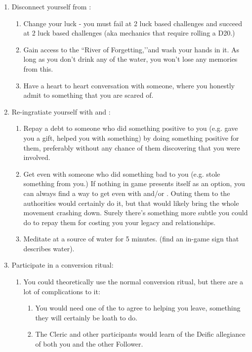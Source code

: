 \documentclass[green]{GL2020}
\begin{document}
\begin{enumerate}
  \item Disconnect yourself from \cGenesis{}:
  \begin{enumerate}
    \item Change your luck - you must fail at 2 luck based challenges and succeed at 2 luck based challenges (aka mechanics that require rolling a D20.)
    \item Gain access to the ``River of Forgetting,’’and wash your hands in it. As long as you don’t drink any of the water, you won’t lose any memories from this.
    \item Have a heart to heart conversation with someone, where you honestly admit to something that you are scared of.
  \end{enumerate}
  \item Re-ingratiate yourself with \cEbb{} and \cFlow{}:
  \begin{enumerate}
    \item Repay a debt to someone who did something positive to you (e.g. gave you a gift, helped you with something) by doing something positive for them, preferably without any chance of them discovering that you were involved.
    \item Get even with someone who did something bad to you (e.g. stole something from you.) If nothing in game presents itself as an option, you can always find a way to get even with \cChupLeader{\full} and/or \cChupSecond{\full}. Outing them to the authorities would certainly do it, but that would likely bring the whole movement crashing down. Surely there’s something more subtle you could do to repay them for costing you your legacy and relationships.
    \item Meditate at a source of water for 5 minutes. (find an in-game sign that describes water).
  \end{enumerate}
  \item Participate in a conversion ritual:
  \begin{enumerate}
    \item You could theoretically use the normal conversion ritual, but there are a lot of complications to it:
    \begin{enumerate}
      \item You would need one of the \pGoaties{} to agree to helping you leave, something they will certainly be loath to do.
      \item The Cleric and other participants would learn of the Deific allegiance of both you and the other Follower.

\end{enumerate}
\end{enumerate}
\end{enumerate}
\end{document}
